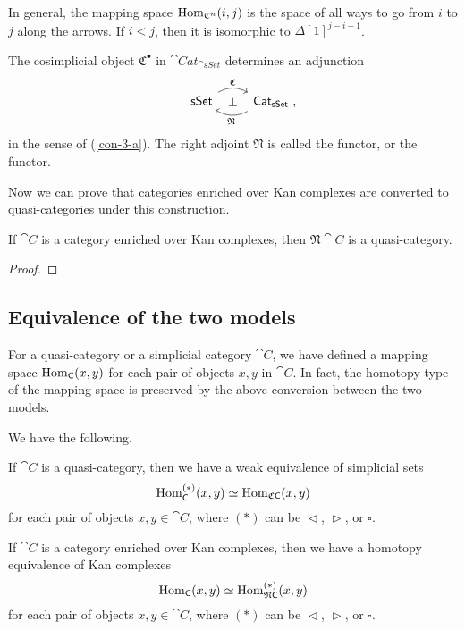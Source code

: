 In general, the mapping space $\operatorname{Hom}_{\mathfrak C^n}(i,j)$
is the space of all ways to go from $i$ to $j$ along the arrows.
If $i<j$, then it is isomorphic to $\Delta{[1]}^{j-i-1}$. 

\begin{definition}
    The cosimplicial object $\mathfrak C^\bullet$ in $\cat{Cat}_{\cat{sSet}}$
    determines an adjunction
    \[\begin{tikzcd}
        \cat{sSet}\ar[r,bend left,"\mathfrak C"]\ar[r,phantom,"\bot"] &
        \rlap{$\cat{Cat}_{\cat{sSet}}$\ ,}\phantom{\cat{sSet}}\ar[l,bend left,"\mathfrak N"]
    \end{tikzcd}\]
    in the sense of \textup{(\ref{con-3-a})}.
    The right adjoint $\mathfrak N$ is called the  functor,
    or the  functor.
\end{definition}

Now we can prove that categories enriched over Kan complexes 
are converted to quasi-categories under this construction.

\begin{proposition}
    If $\cat C$ is a category enriched over Kan complexes,
    then $\mathfrak N\cat C$ is a quasi-category.
\end{proposition}

\begin{proof}
    \nyw
\end{proof}

\subsection{Equivalence of the two models}

For a quasi-category or a simplicial category $\cat C$,
we have defined a mapping space $\operatorname{Hom}_{\mathsf{C}}(x,y)$ for each
pair of objects $x,y$ in $\cat C$.
In fact, the homotopy type of the mapping space 
is preserved by the above conversion between the two models.

\begin{theorem}\label{thm-4-h}
    We have the following.
    \begin{itms}
        \item If $\cat C$ is a quasi-category,
        then we have a weak equivalence of simplicial sets 
        \[ \operatorname{Hom}_{\mathsf{C}}^{(*)}(x,y)\simeq\operatorname{Hom}_{\mathfrak C\mathsf{C}}(x,y) \]
        for each pair of objects $x,y\in\cat C$,
        where $(*)$ can be $\vartriangleleft$, $\vartriangleright$, or $\square$.
        \item If $\cat C$ is a category enriched over Kan complexes,
        then we have a homotopy equivalence of Kan complexes
        \[ \operatorname{Hom}_{\mathsf{C}}(x,y)\simeq\operatorname{Hom}_{\mathfrak N\mathsf{C}}^{(*)}(x,y) \]
        for each pair of objects $x,y\in\cat C$,
        where $(*)$ can be $\vartriangleleft$, $\vartriangleright$, or $\square$.
    \end{itms}
\end{theorem}

